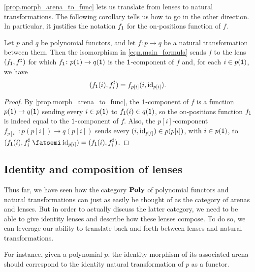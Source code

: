 \documentclass[Book-Poly]{subfiles}
\begin{document}
\cref{prop.morph_arena_to_func} lets us translate from lenses to natural transformations.
The following corollary tells us how to go in the other direction.
In particular, it justifies the notation $f_{\textsf{1}}$ for the on-positions function of $f$.

\begin{corollary} \label{cor.morph_func_to_arena}
Let $p$ and $q$ be polynomial functors, and let $f \colon p \to q$ be a natural transformation between them.
Then the isomorphism in \eqref{eqn.main_formula} sends $f$ to the lens $(f_{\textsf{1}}, f^\sharp)$ for which $f_{\textsf{1}} \colon p(\textsf{1}) \to q(\textsf{1})$ is the $\textsf{1}$-component of $f$ and, for each $i \in p(\textsf{1})$, we have
\[
    (f_{\textsf{1}}(i), f^\sharp_i) = f_{p[i]}(i, \mathrm{id}_{p[i]}).
\]
\end{corollary}
\begin{proof}
By \cref{prop.morph_arena_to_func}, the $\textsf{1}$-component of $f$ is a function $p(\textsf{1})\to q(\textsf{1})$ sending every $i \in p(\textsf{1})$ to $f_{\textsf{1}}(i) \in q(\textsf{1})$, so the on-positions function $f_{\textsf{1}}$ is indeed equal to the $\textsf{1}$-component of $f$.
Also, the $p[i]$-component $f_{p[i]} \colon p(p[i]) \to q(p[i])$ sends every $(i, \mathrm{id}_{p[i]}) \in p(p[i])$, with $i \in p(\textsf{1})$, to $(f_\1(i), f^\sharp_i \then \id_{p[i]}) = (f_\1(i), f^\sharp_i)$.
\end{proof}

\subsection{Identity and composition of lenses} \label{subsec.poly.func_nat.morph.id_comp}

Thus far, we have seen how the category $\mathbf{Poly}$ of polynomial functors and natural transformations can just as easily be thought of as the category of arenas and lenses.
But in order to actually discuss the latter category, we need to be able to give identity lenses and describe how these lenses compose.
To do so, we can leverage our ability to translate back and forth between lenses and natural transformations.

For instance, given a polynomial $p$, the identity morphism of its associated arena should correspond to the identity natural transformation of $p$ as a functor.
\end{document}
